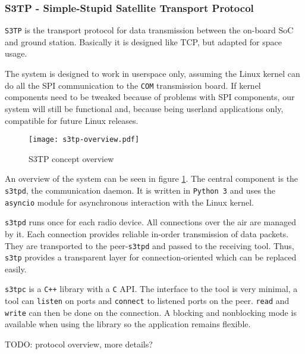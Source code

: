 \documentclass[a4paper]{article}
\begin{document}
\subsubsection{S3TP - Simple-Stupid Satellite Transport Protocol}

\texttt{S3TP} is the transport protocol for data transmission between the
on-board SoC and ground station. Basically it is designed like TCP, but adapted
for space usage.

The system is designed to work in userspace only, assuming the Linux kernel can
do all the SPI communication to the \texttt{COM} transmission board. If kernel
components need to be tweaked because of problems with SPI components, our
system will still be functional and, because being userland applications only,
compatible for future Linux releases.

\begin{figure}
    \centering
    \texttt{[image: s3tp-overview.pdf]}
    \caption{S3TP concept overview}
    \label{fig:s3tpoverview}
\end{figure}

An overview of the system can be seen in figure \ref{fig:s3tpoverview}. The
central component is the \texttt{s3tpd}, the communication daemon. It is written
in \texttt{Python 3} and uses the \texttt{asyncio} module for asynchronous
interaction with the Linux kernel.

\texttt{s3tpd} runs once for each radio device. All connections over the air are
managed by it. Each connection provides reliable in-order transmission of data
packets. They are transported to the peer-\texttt{s3tpd} and passed to the
receiving tool. Thus, \texttt{s3tp} provides a transparent layer for
connection-oriented which can be replaced easily.

\texttt{s3tpc} is a \texttt{C++} library with a \texttt{C} API. The interface to
the tool is very minimal, a tool can \texttt{listen} on ports and
\texttt{connect} to listened ports on the peer. \texttt{read} and \texttt{write}
can then be done on the connection. A blocking and nonblocking mode is available
when using the library so the application remains flexible.

TODO: protocol overview, more details?
\end{document}
